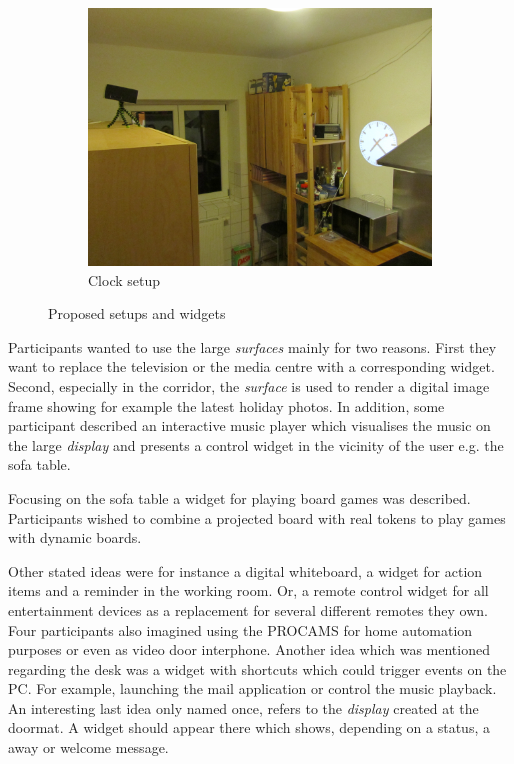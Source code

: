 \begin{figure}
\begin{subfigure}[b]{0.31\textwidth}
                \includegraphics[width=\textwidth]{images/interview/kitchen1.jpg}
                \caption{Clock setup}
                \label{img:clock}
        \end{subfigure}
        \caption{Proposed setups and widgets}\label{fig:animals}
\end{figure}

Participants wanted to use the large \emph{surfaces} mainly for two reasons. First they want to replace the television or the media centre with a corresponding widget. Second, especially in the corridor, the \emph{surface} is used to render a digital image frame showing for example the latest holiday photos. In addition, some participant described an interactive music player which visualises the music on the large \emph{display} and presents a control widget in the vicinity of the user e.g. the sofa table. 

Focusing on the sofa table a widget for playing board games was described. Participants wished to combine a projected board with real tokens to play games with dynamic boards. 

Other stated ideas were for instance a digital whiteboard, a widget for action items and a reminder in the working room. Or, a remote control widget for all entertainment devices as a replacement for several different remotes they own.
Four participants also imagined using the \ac{PROCAMS} for home automation purposes or even as video door interphone. Another idea which was mentioned regarding the desk was a widget with shortcuts which could trigger events on the PC. For example, launching the mail application or control the music playback. An interesting last idea only named once, refers to the \emph{display} created at the doormat. A widget should appear there which shows, depending on a status, a away or welcome message.

